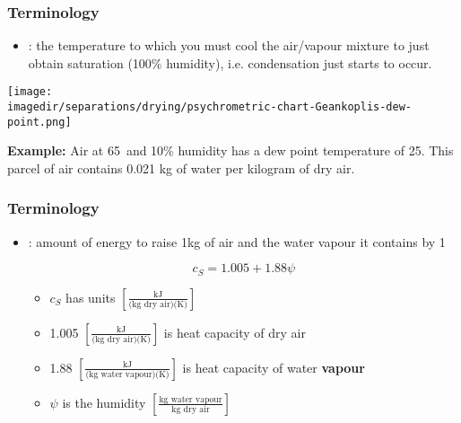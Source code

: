 \begin{frame}\frametitle{Terminology}
	\begin{itemize}
		\item	{\color{purple}{Dew point}}: the temperature to which you must cool the air/vapour mixture to just obtain saturation (100\% humidity), i.e. condensation just starts to occur.
	\end{itemize}
	\begin{center}
		\texttt{[image: \\imagedir/separations/drying/psychrometric-chart-Geankoplis-dew-point.png]}
	\end{center}

	\textbf{Example:} Air at 65\degC$\,$ and 10\% humidity has a dew point temperature of 25\degC. This parcel of air contains 0.021 kg of water per kilogram of dry air.
\end{frame}

\begin{frame}\frametitle{Terminology}
	\begin{itemize}
		\item	 {\color{purple}{Humid heat}}: amount of energy to raise 1kg of air and the water vapour it contains by 1\degC
		
		\begin{exampleblock}{}
			\[c_S = 1.005 + 1.88\psi\]
		\end{exampleblock}
		\begin{itemize}
			\item	$c_S$ has units $\left[\displaystyle \frac{\text{kJ}}{\text{(kg dry air)(K)}} \right]$
			\item	1.005 $\left[\displaystyle \frac{\text{kJ}}{\text{(kg dry air)(K)}} \right]$ is heat capacity of dry air
			\item	1.88 $\left[\displaystyle \frac{\text{kJ}}{\text{(kg water vapour)(K)}} \right]$ is heat capacity of water \textbf{vapour}  
			\item	$\psi$ is the humidity $ \left[ \displaystyle \frac{\text{kg water vapour}}{\text{kg dry air}}\right]$ 
		\end{itemize}
	\end{itemize}
\end{frame}

